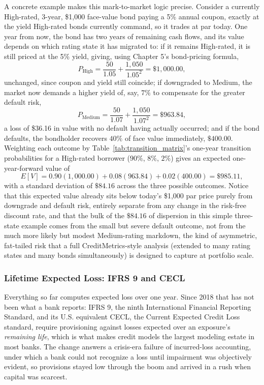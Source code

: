 \documentclass[../ai_in_finance]{subfiles}
\begin{document}
A concrete example makes this mark-to-market logic precise. Consider a currently High-rated, 3-year, \$1,000 face-value bond paying a 5\% annual coupon, exactly at the yield High-rated bonds currently command, so it trades at par today. One year from now, the bond has two years of remaining cash flows, and its value depends on which rating state it has migrated to: if it remains High-rated, it is still priced at the 5\% yield, giving, using Chapter 5's bond-pricing formula,
\begin{equation*}
P_{\text{High}} = \frac{50}{1.05} + \frac{1{,}050}{1.05^2} = \$1{,}000.00,
\end{equation*}
unchanged, since coupon and yield still coincide; if downgraded to Medium, the market now demands a higher yield of, say, $7\%$ to compensate for the greater default risk,
\begin{equation*}
P_{\text{Medium}} = \frac{50}{1.07} + \frac{1{,}050}{1.07^2} = \$963.84,
\end{equation*}
a loss of \$36.16 in value with no default having actually occurred; and if the bond defaults, the bondholder recovers $40\%$ of face value immediately, $\$400.00$. Weighting each outcome by Table~\ref{tab:transition_matrix}'s one-year transition probabilities for a High-rated borrower ($90\%$, $8\%$, $2\%$) gives an expected one-year-forward value of
\begin{equation*}
E[V] = 0.90(1{,}000.00) + 0.08(963.84) + 0.02(400.00) = \$985.11,
\end{equation*}
with a standard deviation of $\$84.16$ across the three possible outcomes.
Notice that this expected value already sits below today's \$1,000 par price purely from downgrade and default risk, entirely separate from any change in the risk-free discount rate, and that the bulk of the $\$84.16$ of dispersion in this simple three-state example comes from the small but severe default outcome, not from the much more likely but modest Medium-rating markdown, the kind of asymmetric, fat-tailed risk that a full CreditMetrics-style analysis (extended to many rating states and many bonds simultaneously) is designed to capture at portfolio scale.


\subsubsection*{Lifetime Expected Loss: IFRS 9 and CECL}
\label{sec:lifetime-ecl}

Everything so far computes expected loss over one year. Since 2018 that has not been what a bank reports: IFRS 9, the ninth International Financial Reporting Standard, and its U.S. equivalent CECL, the Current Expected Credit Loss standard, require provisioning against losses expected over an exposure's \emph{remaining life}, which is what makes credit models the largest modeling estate in most banks. The change answers a crisis-era failure of incurred-loss accounting, under which a bank could not recognize a loss until impairment was objectively evident, so provisions stayed low through the boom and arrived in a rush when capital was scarcest.
\end{document}

